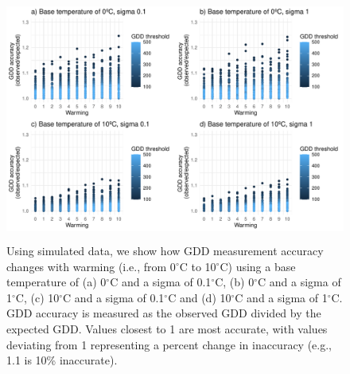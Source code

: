 \documentclass{article}\usepackage[]{graphicx}\usepackage[]{color}
\begin{document}
\begin{figure}[H]
    \centering
    \includegraphics[height=8cm, width=12cm]{..//analyses/figures/gddratio_warming.pdf}
\caption{Using simulated data, we show how GDD measurement accuracy changes with warming (i.e., from 0$^{\circ}$C to 10$^{\circ}$C) using a base temperature of (a) 0$^{\circ}$C and a sigma of 0.1$^{\circ}$C, (b) 0$^{\circ}$C and a sigma of 1$^{\circ}$C, (c) 10$^{\circ}$C and a sigma of 0.1$^{\circ}$C and (d) 10$^{\circ}$C and a sigma of 1$^{\circ}$C. GDD accuracy is measured as the observed GDD divided by the expected GDD. Values closest to 1 are most accurate, with values deviating from 1 representing a percent change in inaccuracy (e.g., 1.1 is 10\% inaccurate). }
\label{fig:warming}
\end{figure}
  
  
\end{document}
